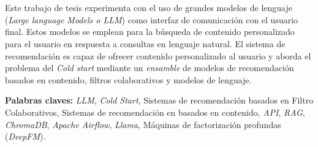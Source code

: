 \chapter*{\runtitulo}
\noindent Este trabajo de tesis experimenta con el uso de grandes modelos de lenguaje (\textit{Large language Models o LLM}) 
como interfaz de comunicación con el usuario final. Estos modelos se emplean para la búsqueda de contenido personalizado 
para el usuario en respuesta a consultas en lenguaje natural. El sistema de recomendación es capaz de ofrecer contenido 
personalizado al usuario y aborda el problema del \textit{Cold start} mediante un \textit{ensamble} de modelos de recomendación
basados en contenido, filtros colaborativos y modelos de lenguaje.

\bigskip

\noindent\textbf{Palabras claves:} \textit{LLM}, \textit{Cold Start}, Sistemas de recomendación basados en Filtro Colaborativos, 
Sistemas de recomendación en basados en contenido, \textit{API}, \textit{RAG}, \textit{ChromaDB}, 
\textit{Apache Airflow}, \textit{Llama}, Máquinas de factorización profundas (\textit{DeepFM}).